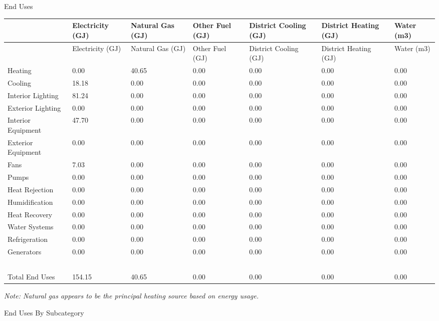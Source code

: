 End Uses

{\scriptsize
\begin{longtable}[c]{>{\raggedright}p{0.85in}>{\raggedright}p{0.85in}>{\raggedright}p{0.85in}>{\raggedright}p{0.85in}>{\raggedright}p{0.85in}>{\raggedright}p{0.85in}>{\raggedright}p{0.85in}}
\toprule
~ & Electricity (GJ) & Natural Gas (GJ) & Other Fuel (GJ) & District Cooling (GJ) & District Heating (GJ) & Water (m3) \tabularnewline
\midrule
\endfirsthead

\toprule
~ & Electricity (GJ) & Natural Gas (GJ) & Other Fuel (GJ) & District Cooling (GJ) & District Heating (GJ) & Water (m3) \tabularnewline
\midrule
\endhead

Heating & 0.00 & 40.65 & 0.00 & 0.00 & 0.00 & 0.00 \tabularnewline
Cooling & 18.18 & 0.00 & 0.00 & 0.00 & 0.00 & 0.00 \tabularnewline
Interior Lighting & 81.24 & 0.00 & 0.00 & 0.00 & 0.00 & 0.00 \tabularnewline
Exterior Lighting & 0.00 & 0.00 & 0.00 & 0.00 & 0.00 & 0.00 \tabularnewline
Interior Equipment & 47.70 & 0.00 & 0.00 & 0.00 & 0.00 & 0.00 \tabularnewline
Exterior Equipment & 0.00 & 0.00 & 0.00 & 0.00 & 0.00 & 0.00 \tabularnewline
Fans & 7.03 & 0.00 & 0.00 & 0.00 & 0.00 & 0.00 \tabularnewline
Pumps & 0.00 & 0.00 & 0.00 & 0.00 & 0.00 & 0.00 \tabularnewline
Heat Rejection & 0.00 & 0.00 & 0.00 & 0.00 & 0.00 & 0.00 \tabularnewline
Humidification & 0.00 & 0.00 & 0.00 & 0.00 & 0.00 & 0.00 \tabularnewline
Heat Recovery & 0.00 & 0.00 & 0.00 & 0.00 & 0.00 & 0.00 \tabularnewline
Water Systems & 0.00 & 0.00 & 0.00 & 0.00 & 0.00 & 0.00 \tabularnewline
Refrigeration & 0.00 & 0.00 & 0.00 & 0.00 & 0.00 & 0.00 \tabularnewline
Generators & 0.00 & 0.00 & 0.00 & 0.00 & 0.00 & 0.00 \tabularnewline
~ & ~ & ~ & ~ & ~ & ~ & ~ \tabularnewline
Total End Uses & 154.15 & 40.65 & 0.00 & 0.00 & 0.00 & 0.00 \tabularnewline
\bottomrule
\end{longtable}}

\emph{Note: Natural gas appears to be the principal heating source based on energy usage.}

End Uses By Subcategory

